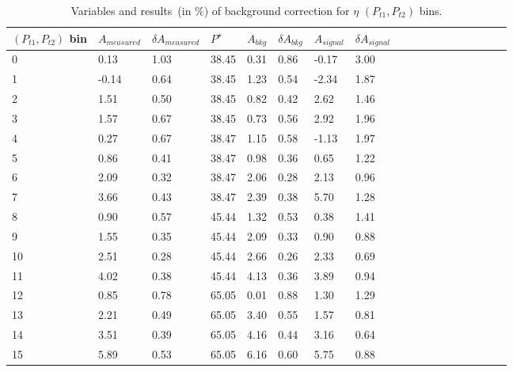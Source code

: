 \begin{table}[H]\footnotesize
\centering
\begin{tabular}{|l|l|l|l|l|l|l|l|l|l|l|l|l|l|l|l|l|l|}
\\ \hline
$(P_{t1},P_{t2})$ bin & $A_{measured}$ & $\delta A_{measured}$ & $P^{\star}$ & $A_{bkg}$ & $\delta A_{bkg}$ & $A_{signal}$ & $\delta A_{signal}$ \\ \hline
0 & 0.13 & 1.03 & 38.45 & 0.31 & 0.86 & -0.17  & 3.00 \\ \hline 
1 & -0.14 & 0.64 & 38.45 & 1.23 & 0.54 & -2.34  & 1.87 \\ \hline 
2 & 1.51 & 0.50 & 38.45 & 0.82 & 0.42 & 2.62 & 1.46 \\ \hline 
3 & 1.57 & 0.67 & 38.45 & 0.73 & 0.56 & 2.92  & 1.96 \\ \hline 
4 & 0.27 & 0.67 & 38.47 & 1.15 & 0.58 & -1.13 & 1.97 \\ \hline 
5 & 0.86 & 0.41 & 38.47 & 0.98 & 0.36 & 0.65 & 1.22 \\ \hline 
6 & 2.09 & 0.32 & 38.47 & 2.06 & 0.28 & 2.13 & 0.96 \\ \hline 
7 & 3.66 & 0.43 & 38.47 & 2.39 & 0.38 & 5.70  & 1.28 \\ \hline 
8 & 0.90 & 0.57 & 45.44 & 1.32 & 0.53 & 0.38  & 1.41 \\ \hline 
9 & 1.55 & 0.35 & 45.44 & 2.09 & 0.33 & 0.90  & 0.88 \\ \hline 
10 & 2.51 & 0.28 & 45.44 & 2.66 & 0.26 & 2.33 & 0.69 \\ \hline 
11 & 4.02 & 0.38 & 45.44 & 4.13 & 0.36 & 3.89& 0.94 \\ \hline 
12 & 0.85 & 0.78 & 65.05 & 0.01 & 0.88 & 1.30  & 1.29 \\ \hline 
13 & 2.21 & 0.49 & 65.05 & 3.40 & 0.55 & 1.57  & 0.81 \\ \hline 
14 & 3.51 & 0.39 & 65.05 & 4.16 & 0.44 & 3.16 & 0.64 \\ \hline 
15 & 5.89 & 0.53 & 65.05 & 6.16 & 0.60 & 5.75 & 0.88 \\ \hline 
\end{tabular}
\caption{Variables and results~(in $\%$) of background correction for $\eta$ $(P_{t1},P_{t2})$ bins. }
\label{tab:etacomptbkgcor}
\end{table} 

